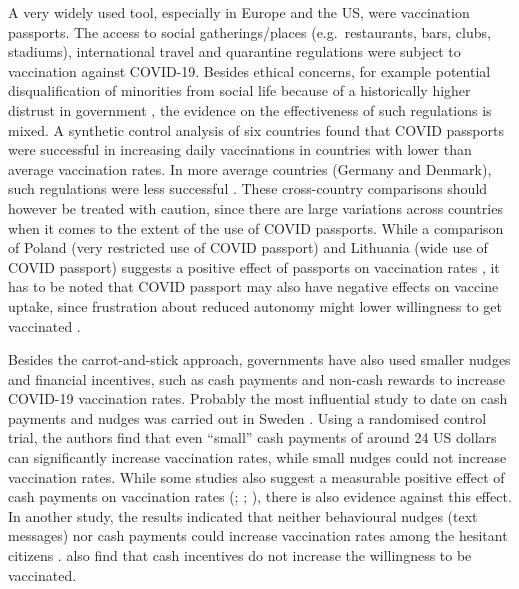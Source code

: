 \documentclass{scrbook}
\begin{document}
A very widely used tool, especially in Europe and the US, were
vaccination passports. The access to social gatherings/places
(e.g.~restaurants, bars, clubs, stadiums), international travel and
quarantine regulations were subject to vaccination against COVID-19.
Besides ethical concerns, for example potential disqualification of
minorities from social life because of a historically higher distrust in
government \parencite{gostin_digital_2021}, the evidence on the
effectiveness of such regulations is mixed. A synthetic control analysis
of six countries found that COVID passports were successful in
increasing daily vaccinations in countries with lower than average
vaccination rates. In more average countries (Germany and Denmark), such
regulations were less successful \parencite{mills_effect_2022}. These
cross-country comparisons should however be treated with caution, since
there are large variations across countries when it comes to the extent
of the use of COVID passports. While a comparison of Poland (very
restricted use of COVID passport) and Lithuania (wide use of COVID
passport) suggests a positive effect of passports on vaccination rates
\parencite{walkowiak_covid-19_2021}, it has to be noted that COVID
passport may also have negative effects on vaccine uptake, since
frustration about reduced autonomy might lower willingness to get
vaccinated \parencite{porat_vaccine_2021}.

Besides the carrot-and-stick approach, governments have also used
smaller nudges and financial incentives, such as cash payments and
non-cash rewards to increase COVID-19 vaccination rates. Probably the
most influential study to date on cash payments and nudges was carried
out in Sweden \parencite{campos-mercade_monetary_2021}. Using a
randomised control trial, the authors find that even ``small'' cash
payments of around 24 US dollars can significantly increase vaccination
rates, while small nudges could not increase vaccination rates. While
some studies also suggest a measurable positive effect of cash payments
on vaccination rates (\cite{wong_guaranteed_2022};
\cite{kluver_incentives_2021}; \cite{kim_vaccination_2021-1}), there is
also evidence against this effect. In another study, the results
indicated that neither behavioural nudges (text messages) nor cash
payments could increase vaccination rates among the hesitant citizens
\parencite{jacobson_can_2022}. \textcite{sprengholz_money_2021} also
find that cash incentives do not increase the willingness to be
vaccinated.
\end{document}
